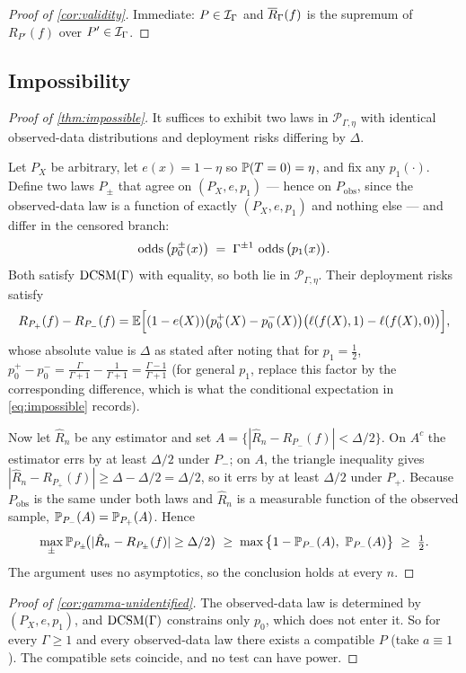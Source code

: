 \begin{proof}[Proof of \cref{cor:validity}]
Immediate: $P\in\mathcal{I}_\Gamma$ and $\overline{R}_\Gamma(f)$ is the supremum of $R_{P'}(f)$
over $P'\in\mathcal{I}_\Gamma$.
\end{proof}

\subsection{Impossibility}
\label{app:impossibility}

\begin{proof}[Proof of \cref{thm:impossible}]
It suffices to exhibit two laws in $\mathcal{P}_{\Gamma,\eta}$ with identical
observed-data distributions and deployment risks differing by $\Delta$.

Let $P_X$ be arbitrary, let $e(x)=1-\eta$ so $\mathbb{P}(T=0)=\eta$, and fix any
$p_1(\cdot)$. Define two laws $P_{\pm}$ that agree on $(P_X, e, p_1)$ --- hence
on $P_{\mathrm{obs}}$, since the observed-data law is a function of exactly
$(P_X,e,p_1)$ and nothing else --- and differ in the censored branch:
\[
  \operatorname{odds}\big(p_0^{\pm}(x)\big) \;=\; \Gamma^{\pm1}\,\operatorname{odds}\big(p_1(x)\big).
\]
Both satisfy $\textup{DCSM}(\Gamma)$ with equality, so both lie in
$\mathcal{P}_{\Gamma,\eta}$. Their deployment risks satisfy
\[
  R_{P_+}(f)-R_{P_-}(f)
  = \mathbb{E}\Big[(1-e(X))\big(p_0^{+}(X)-p_0^{-}(X)\big)
    \big(\ell(f(X),1)-\ell(f(X),0)\big)\Big],
\]
whose absolute value is $\Delta$ as stated after noting that for
$p_1=\tfrac12$, $p_0^{+}-p_0^{-}=\tfrac{\Gamma}{\Gamma+1}-\tfrac{1}{\Gamma+1}
=\tfrac{\Gamma-1}{\Gamma+1}$ (for general $p_1$, replace this factor by the
corresponding difference, which is what the conditional expectation in
\eqref{eq:impossible} records).

Now let $\hat R_n$ be any estimator and set
$A=\{|\hat R_n - R_{P_-}(f)| < \Delta/2\}$. On $A^{c}$ the estimator errs by at
least $\Delta/2$ under $P_-$; on $A$, the triangle inequality gives
$|\hat R_n - R_{P_+}(f)| \ge \Delta - \Delta/2 = \Delta/2$, so it errs by at
least $\Delta/2$ under $P_+$. Because $P_{\mathrm{obs}}$ is the same under both
laws and $\hat R_n$ is a measurable function of the observed sample,
$\mathbb{P}_{P_-}(A)=\mathbb{P}_{P_+}(A)$. Hence
\[
  \max_{\pm}\mathbb{P}_{P_\pm}\!\big(|\hat R_n - R_{P_\pm}(f)|\ge\Delta/2\big)
  \;\ge\;
  \max\big\{1-\mathbb{P}_{P_-}(A),\ \mathbb{P}_{P_-}(A)\big\}
  \;\ge\;\tfrac12 .
\]
The argument uses no asymptotics, so the conclusion holds at every $n$.
\end{proof}

\begin{proof}[Proof of \cref{cor:gamma-unidentified}]
The observed-data law is determined by $(P_X, e, p_1)$, and $\textup{DCSM}(\Gamma)$
constrains only $p_0$, which does not enter it. So for every $\Gamma\ge1$ and
every observed-data law there exists a compatible $P$ (take $a\equiv1$). The
compatible sets coincide, and no test can have power.
\end{proof}

